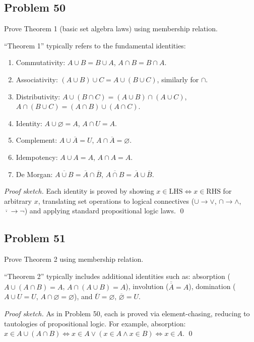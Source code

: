 \subsection*{Problem 50}
Prove Theorem 1 (basic set algebra laws) using membership relation.

``Theorem 1'' typically refers to the fundamental identities:
\begin{enumerate}
  \item Commutativity: $A \cup B = B \cup A$, $A \cap B = B \cap A$.
  \item Associativity: $(A \cup B) \cup C = A \cup (B \cup C)$, similarly for $\cap$.
  \item Distributivity: $A \cup (B \cap C) = (A \cup B) \cap (A \cup C)$, $A \cap (B \cup C) = (A \cap B) \cup (A \cap C)$.
  \item Identity: $A \cup \varnothing = A$, $A \cap U = A$.
  \item Complement: $A \cup \overline{A} = U$, $A \cap \overline{A} = \varnothing$.
  \item Idempotency: $A \cup A = A$, $A \cap A = A$.
  \item De Morgan: $\overline{A \cup B} = \overline{A} \cap \overline{B}$, $\overline{A \cap B} = \overline{A} \cup \overline{B}$.
\end{enumerate}

\textit{Proof sketch.} Each identity is proved by showing $x \in \text{LHS} \iff x \in \text{RHS}$ for arbitrary $x$, translating set operations to logical connectives ($\cup \to \lor$, $\cap \to \land$, $\overline{\cdot} \to \lnot$) and applying standard propositional logic laws. \qed

\subsection*{Problem 51}
Prove Theorem 2 using membership relation.

``Theorem 2'' typically includes additional identities such as:
absorption ($A \cup (A \cap B) = A$, $A \cap (A \cup B) = A$), involution ($\overline{\overline{A}} = A$), domination ($A \cup U = U$, $A \cap \varnothing = \varnothing$), and $\overline{U} = \varnothing$, $\overline{\varnothing} = U$.

\textit{Proof sketch.} As in Problem 50, each is proved via element-chasing, reducing to tautologies of propositional logic. For example, absorption: $x \in A \cup (A \cap B) \iff x \in A \lor (x \in A \land x \in B) \iff x \in A$. \qed

